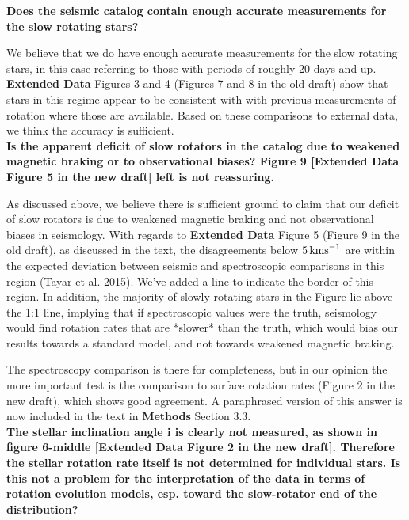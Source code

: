 \documentclass[11pt]{article}
\begin{document}
\noindent\textbf{Does the seismic catalog contain enough accurate measurements for the slow rotating stars?}

We believe that we do have enough accurate measurements for the slow rotating stars, in this case referring to those with periods of roughly 20 days and up. \textbf{Extended Data} Figures 3 and 4 (Figures 7 and 8 in the old draft) show that stars in this regime appear to be consistent with with previous measurements of rotation where those are available. Based on these comparisons to external data, we think the accuracy is sufficient.\\

\noindent\textbf{Is the apparent deficit of slow rotators in the catalog due to weakened magnetic braking or to observational biases? Figure 9 [\textbf{Extended Data} Figure 5 in the new draft] left is not reassuring.}

As discussed above, we believe there is sufficient ground to claim that our deficit of slow rotators is due to weakened magnetic braking and not observational biases in seismology. With regards to \textbf{Extended Data} Figure 5 (Figure 9 in the old draft), as discussed in the text, the disagreements below $5\,  \rm{kms}^{-1}$ are within the expected deviation between seismic and spectroscopic comparisons in this region (Tayar et al. 2015). We’ve added a line to indicate the border of this region. In addition, the majority of slowly rotating stars in the Figure lie above the 1:1 line, implying that if spectroscopic values were the truth, seismology would find rotation rates that are *slower* than the truth, which would bias our results towards a standard model, and not towards weakened magnetic braking.

The spectroscopy comparison is there for completeness, but in our opinion the more important test is the comparison to surface rotation rates (Figure 2 in the new draft), which shows good agreement. A paraphrased version of this answer is now included in the text in \textbf{Methods} Section 3.3.\\

\noindent \textbf{The stellar inclination angle i is clearly not measured, as shown in figure 6-middle [\textbf{Extended Data} Figure 2 in the new draft]. Therefore the stellar rotation rate itself is not determined for individual stars. Is this not a problem for the interpretation of the data in terms of rotation evolution models, esp. toward the slow-rotator end of the distribution?}
\end{document}
